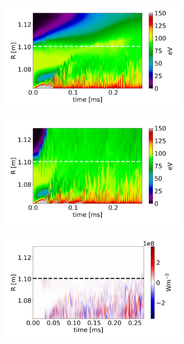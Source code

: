 \begin{figure}[H]\centering
	\begin{subfigure}[t]{0.45\textwidth}
		\centering
		\includegraphics[width=1\textwidth]{schemes/plotOMPtime_spec1_T_PHI.jpg}
	\end{subfigure}
	\begin{subfigure}[t]{0.45\textwidth}
		\centering
		\includegraphics[width=1\textwidth]{schemes/plotOMPtime_spec1_T_PHIJ_mass_1.jpg}
	\end{subfigure}
	\begin{subfigure}[t]{0.45\textwidth}
		\centering
		\includegraphics[width=1\textwidth]{schemes/plotOMPtime_spec1_fluxE_psi_PHI.jpg}

\end{subfigure}
\end{figure}
